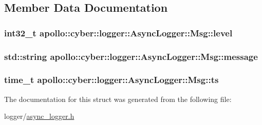 \subsection{Member Data Documentation}
\hypertarget{structapollo_1_1cyber_1_1logger_1_1AsyncLogger_1_1Msg_a4118d2f0f6a96024b5c95eb73f743c15}{
\subsubsection[{level}]{\setlength{\rightskip}{0pt plus 5cm}int32\-\_\-t apollo\-::cyber\-::logger\-::\-Async\-Logger\-::\-Msg\-::level}}\label{structapollo_1_1cyber_1_1logger_1_1AsyncLogger_1_1Msg_a4118d2f0f6a96024b5c95eb73f743c15}
\hypertarget{structapollo_1_1cyber_1_1logger_1_1AsyncLogger_1_1Msg_a69f346007aaf17c8cc69297fecffb5f7}{
\subsubsection[{message}]{\setlength{\rightskip}{0pt plus 5cm}std\-::string apollo\-::cyber\-::logger\-::\-Async\-Logger\-::\-Msg\-::message}}\label{structapollo_1_1cyber_1_1logger_1_1AsyncLogger_1_1Msg_a69f346007aaf17c8cc69297fecffb5f7}
\hypertarget{structapollo_1_1cyber_1_1logger_1_1AsyncLogger_1_1Msg_a35ff514a7adda9483a8ace83ef3d88e6}{
\subsubsection[{ts}]{\setlength{\rightskip}{0pt plus 5cm}time\-\_\-t apollo\-::cyber\-::logger\-::\-Async\-Logger\-::\-Msg\-::ts}}\label{structapollo_1_1cyber_1_1logger_1_1AsyncLogger_1_1Msg_a35ff514a7adda9483a8ace83ef3d88e6}


The documentation for this struct was generated from the following file\-:\begin{DoxyCompactItemize}
\item 
logger/\hyperlink{async__logger_8h}{async\-\_\-logger.\-h}\end{DoxyCompactItemize}
